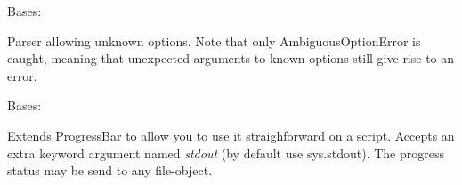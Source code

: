 \documentclass[letterpaper,10pt,english]{sphinxmanual}
\begin{document}
\begin{fulllineitems}
\label{index:encore.utils.AllowUnrecognizedOptionParser}
Bases: 

Parser allowing unknown options. Note that only AmbiguousOptionError
is caught, meaning that unexpected arguments to known options still give
rise to an error.

\end{fulllineitems}


\begin{fulllineitems}
\label{index:encore.utils.AnimatedProgressBar}
Bases: {\hyperref[index:encore.utils.ProgressBar]{\emph{}}}

Extends ProgressBar to allow you to use it straighforward on a script.
Accepts an extra keyword argument named \emph{stdout} (by default use sys.stdout).
The progress status may be send to any file-object.

\begin{fulllineitems}
\label{index:encore.utils.AnimatedProgressBar.show_progress}
\end{fulllineitems}


\end{fulllineitems}

\end{document}
